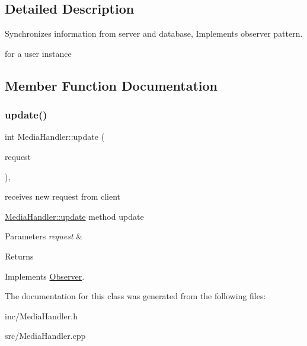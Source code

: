 \subsection{Detailed Description}
Synchronizes information from server and database, Implements observer pattern. 

for a user instance 

\subsection{Member Function Documentation}
\mbox{\label{classMediaHandler_ae0c5fa9c02ac287d2e04699d67a02eaf}} 
\subsubsection{\texorpdfstring{update()}{update()}}
{\footnotesize\ttfamily int Media\+Handler\+::update (\begin{DoxyParamCaption}\item[{\hyperlink{classRequest}{Request} \&}]{request }\end{DoxyParamCaption})\hspace{0.3cm}{\ttfamily [override]}, {\ttfamily [virtual]}}



receives new request from client 

\hyperlink{classMediaHandler_ae0c5fa9c02ac287d2e04699d67a02eaf}{Media\+Handler\+::update} method update 
\begin{DoxyParams}{Parameters}
{\em request} & \\
\hline
\end{DoxyParams}
\begin{DoxyReturn}{Returns}

\end{DoxyReturn}


Implements \hyperlink{classObserver_acc79119027d8770fe4946161d6274a00}{Observer}.



The documentation for this class was generated from the following files\+:\begin{DoxyCompactItemize}
\item 
inc/Media\+Handler.\+h\item 
src/Media\+Handler.\+cpp\end{DoxyCompactItemize}
